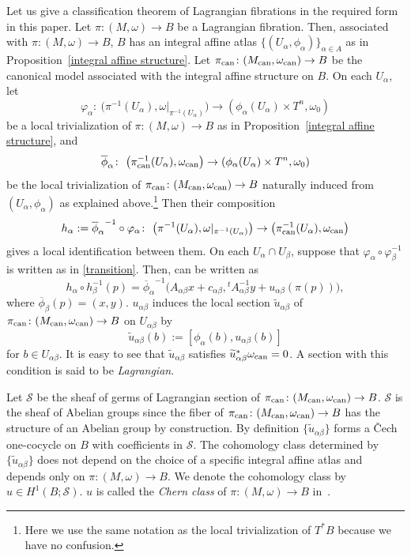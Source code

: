\documentclass[10pt,a4paper]{amsart}
\numberwithin{equation}{section}
\newcommand{\SCS}{\mathscr S}
\renewcommand{\tilde}{\widetilde}
\begin{document}
Let us give a classification theorem of Lagrangian fibrations in the required form in this paper.
Let $\pi\colon (M,\omega)\to B$ be a Lagrangian fibration. Then, associated with $\pi\colon (M,\omega)\to B$, $B$ has an integral affine atlas $\{ (U_\alpha,\phi_\alpha)\}_{\alpha\in A}$ as in Proposition~\ref{integral affine structure}. Let $\pi_{\rm can}\colon (M_{\rm can},\omega_{\rm can})\to B$ be the canonical model associated with the integral affine structure on $B$. On each $U_\alpha$, let
\[
\varphi_\alpha\colon \ \bigl(\pi^{-1}(U_\alpha),\omega|_{\pi^{-1}(U_\alpha)}\bigr)\to (\phi_\alpha(U_\alpha)\times T^n,\omega_0)
\]
 be a local trivialization of $\pi\colon (M,\omega)\to B$ as in Proposition~\ref{integral affine structure}, and
 \[
 \overline\phi_\alpha\colon \ \bigl(\pi_{\rm can}^{-1}(U_\alpha), \omega_{\rm can}\bigr)\to (\phi_\alpha(U_\alpha)\times T^n,\omega_0)
 \]
 be the local trivialization of $\pi_{\rm can}\colon (M_{\rm can},\omega_{\rm can})\to B$ naturally induced from $(U_\alpha,\phi_\alpha)$ as explained above.\footnote{Here we use the same notation as the local trivialization of $T^*B$ because we have no confusion.} Then their composition
\[
h_\alpha:={\overline\phi_\alpha}^{-1}\circ \varphi_\alpha\colon\ \bigl(\pi^{-1}(U_\alpha),\omega|_{\pi^{-1}(U_\alpha)}\bigr)\to \bigl(\pi_{\rm can}^{-1}(U_\alpha), \omega_{\rm can}\bigr)
\]
gives a local identification between them.
%
On each $U_\alpha\cap U_\beta$, suppose that $\varphi_\alpha\circ\varphi_\beta^{-1}$ is written as in \eqref{transition}. Then,  can be written as
\[
h_\alpha\circ h_\beta^{-1}(p)={\overline\phi_\alpha}^{-1}\bigl(A_{\alpha\beta}x+c_{\alpha\beta},{}^tA_{\alpha\beta}^{-1}y+u_{\alpha\beta}(\pi(p))\bigr),
\]
where $\overline\phi_\beta(p)=(x,y)$. $u_{\alpha\beta}$ induces the local section $\tilde u_{\alpha\beta}$ of $\pi_{\rm can}\colon (M_{\rm can},\omega_{\rm can})\to B$ on $U_{\alpha\beta}$ by
\[
\tilde u_{\alpha\beta}(b):=[\phi_\alpha(b),u_{\alpha\beta}(b)]
\]
for $b\in U_{\alpha\beta}$. It is easy to see that $\tilde u_{\alpha\beta}$ satisfies $\tilde u_{\alpha\beta}^*\omega_{\rm can}=0$. A section with this condition is said to be \emph{Lagrangian}.

Let $\SCS$ be the sheaf of germs of Lagrangian section of $\pi_{\rm can}\colon (M_{\rm can},\omega_{\rm can})\to B$. $\SCS$ is the sheaf of Abelian groups since the fiber of $\pi_{\rm can}\colon (M_{\rm can},\omega_{\rm can})\to B$ has the structure of an Abelian group by construction. By definition $\{ \tilde u_{\alpha\beta}\}$ forms a \v{C}ech one-cocycle on $B$ with coefficients in $\SCS$. The cohomology class determined by $\{ \tilde u_{\alpha\beta}\}$ does not depend on the choice of a specific integral affine atlas and depends only on $\pi\colon (M,\omega)\to B$. We denote the cohomology class by~${u \in H^1(B;\SCS)}$.
$u$ is called the \emph{Chern class} of $\pi\colon (M,\omega)\to B$ in~\cite{Du}.
\end{document}
